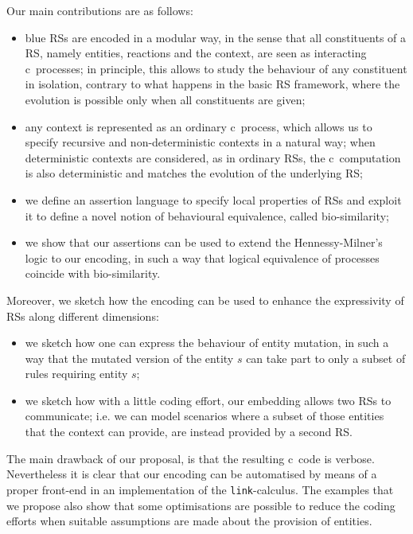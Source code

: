 Our main contributions are as follows:
\begin{itemize}
\item 
\begin{color}{blue}
RSs are encoded in a modular way, in the sense that all constituents of a RS, namely entities, reactions and the context, are seen as interacting  c\CNA \ processes; in principle, this allows to study the behaviour of any constituent in isolation, contrary to what happens in the basic RS framework, where the evolution is possible only when all constituents are given;
\end{color}

\item any context is represented as an ordinary c\CNA \ process, which allows us to specify recursive and non-deterministic contexts in a natural way; 
when deterministic contexts are considered, as in ordinary RSs, the c\CNA \
computation is also deterministic and matches the evolution of the underlying RS;

\item we define an assertion language to specify local properties of 
RSs and exploit it to define a novel notion of behavioural equivalence,
called bio-similarity;

\item we show that our assertions can be used to extend the Hennessy-Milner's logic to our 
encoding, in such a way that logical equivalence of processes coincide with bio-similarity.
\end{itemize}

Moreover, we sketch how the encoding can be used to enhance the expressivity of RSs along different dimensions:
\begin{itemize}
\item we sketch how one can express the behaviour of entity mutation,
in such a way that the mutated version of the entity
$s$ can  take part to only a subset of rules requiring entity $s$;
\item we sketch how with a little coding effort, our 
embedding
allows two RSs to
communicate; i.e. we can model scenarios where a subset of those entities that the context  can
provide, are instead provided by a second RS.
\end{itemize}

The main drawback of our proposal, is that the resulting c\CNA \ 
code
is
verbose. Nevertheless it is clear that our
encoding
can be automatised by means of a proper front-end in
an implementation of the {\tt link}-calculus. 
The examples that we propose also show that some optimisations are possible
to reduce the coding efforts when suitable assumptions are made about the provision of entities.

